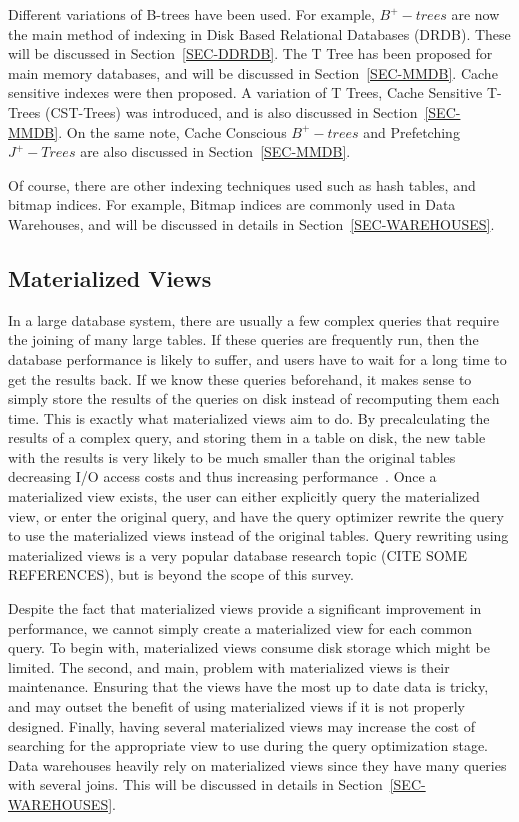 \documentclass[12pt,a4paper]{article}
\begin{document}
Different variations of B-trees have been used. For example, $B^{+}-trees$ are now the main method of indexing in Disk Based Relational Databases (DRDB). These will be discussed in Section~\ref{SEC-DDRDB}. The T Tree has been proposed for main memory databases, and will be discussed in Section~\ref{SEC-MMDB}. Cache sensitive indexes were then proposed. A variation of T Trees, Cache Sensitive T-Trees (CST-Trees) was introduced, and is also discussed in Section~\ref{SEC-MMDB}. On the same note, Cache Conscious $B^{+}-trees$ and Prefetching $J^{+}-Trees$ are also discussed in Section~\ref{SEC-MMDB}. 

Of course, there are other indexing techniques used such as hash tables, and bitmap indices. For example, Bitmap indices are commonly used in Data Warehouses, and will be discussed in details in Section~\ref{SEC-WAREHOUSES}.

\subsection{Materialized Views}

In a large database system, there are usually a few complex queries that require the joining of many large tables. If these queries are frequently run, then the database performance is likely to suffer, and users have to wait for a long time to get the results back. If we know these queries beforehand, it makes sense to simply store the results of the queries on disk instead of recomputing them each time. This is exactly what materialized views aim to do. By precalculating the results of a complex query, and storing them in a table on disk, the new table with the results is very likely to be much smaller than the original tables decreasing I/O access costs and thus increasing performance~\cite{lightstone2007physical}. Once a materialized view exists, the user can either explicitly query the materialized view, or enter the original query, and have the query optimizer rewrite the query to use the materialized views instead of the original tables. Query rewriting using materialized views is a very popular database research topic (CITE SOME REFERENCES), but is beyond the scope of this survey.

Despite the fact that materialized views provide a significant improvement in performance, we cannot simply create a materialized view for each common query. To begin with, materialized views consume disk storage which might be limited. The second, and main, problem with materialized views is their maintenance. Ensuring that the views have the most up to date data is tricky, and may outset the benefit of using materialized views if it is not properly designed. Finally, having several materialized views may increase the cost of searching for the appropriate view to use during the query optimization stage. Data warehouses heavily rely on materialized views since they have many queries with several joins. This will be discussed in details in Section~\ref{SEC-WAREHOUSES}.
\end{document}
